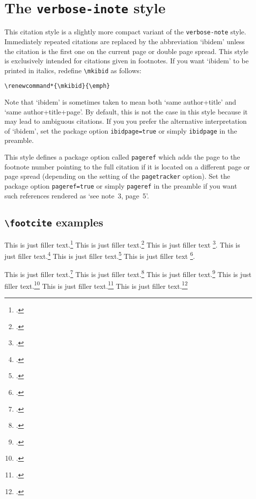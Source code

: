 \documentclass[a4paper]{article}
\newcommand{\cmd}[1]{\texttt{\textbackslash #1}}
\begin{document}
\section*{The \texttt{verbose-inote} style}

This citation style is a slightly more compact variant of the
\texttt{verbose-note} style. Immediately repeated citations are
replaced by the abbreviation `ibidem' unless the citation is the
first one on the current page or double page spread. This style is
exclusively intended for citations given in footnotes. If you want
`ibidem' to be printed in italics, redefine \cmd{mkibid} as follows:

\begin{verbatim}
\renewcommand*{\mkibid}{\emph}
\end{verbatim}
%
Note that `ibidem' is sometimes taken to mean both `same
author+title' and `same author+title+page'. By default, this is not
the case in this style because it may lead to ambiguous citations.
If you you prefer the alternative interpretation of `ibidem', set
the package option \texttt{ibidpage=true} or simply
\texttt{ibidpage} in the preamble.

This style defines a package option called \texttt{pageref} which
adds the page to the footnote number pointing to the full citation
if it is located on a different page or page spread (depending on
the setting of the \texttt{pagetracker} option). Set the package
option \texttt{pageref=true} or simply \texttt{pageref} in the
preamble if you want such references rendered as `see note~3,
page~5'.

\subsection*{\cmd{footcite} examples}

This is just filler text.\footcite{aristotle:anima}
This is just filler text.\footcite{aristotle:physics}
This is just filler text \footcite{averroes/bland}.
This is just filler text.\footcite{aristotle:anima}
This is just filler text.\footcite{aristotle:physics}
This is just filler text \footcite{averroes/bland}.

\clearpage

This is just filler text.\footcite{aristotle:anima}
This is just filler text.\footcite{aristotle:anima}
This is just filler text.\footcite{aristotle:physics}
This is just filler text.\footcite{aristotle:physics}
\clearpage
This is just filler text.\footcite{aristotle:physics}
This is just filler text.\footcite{aristotle:physics}
\end{document}
